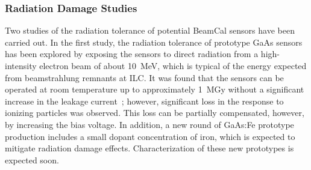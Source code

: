 \subsubsection{Radiation Damage Studies}

Two studies of the radiation tolerance of potential BeamCal sensors have
been carried out.
In the first study, the radiation tolerance of prototype GaAs sensors
has been explored by
exposing the sensors to direct radiation from a high-intensity electron
beam of
about \SI{10}{MeV}, which is typical of the energy expected from
beamstrahlung
remnants at ILC. It was found that the sensors can be operated at
room temperature up
to approximately \SI{1}{MGy} without a significant increase in the
leakage current~\cite{1748-0221-7-11-P11022}; however, significant loss
in the response
to ionizing particles was observed. This loss can be partially
compensated, however,
by increasing the bias voltage. In addition, a new round of GaAs:Fe
prototype production
includes a small dopant concentration of iron, which is expected to mitigate
radiation damage effects. Characterization of these new prototypes is
expected soon.

